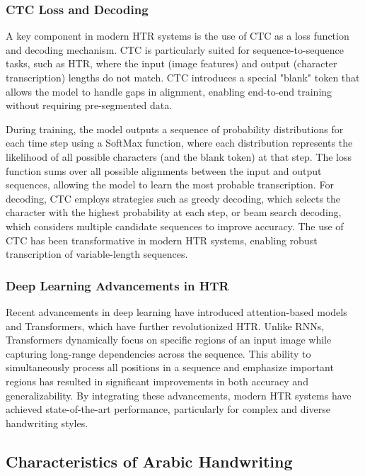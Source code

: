 \documentclass[conference]{IEEEtran}
\begin{document}
\subsubsection{CTC Loss and Decoding}

A key component in modern HTR systems is the use of CTC as a loss function and decoding mechanism. CTC is particularly suited for sequence-to-sequence tasks, such as HTR, where the input (image features) and output (character transcription) lengths do not match. CTC introduces a special "blank" token that allows the model to handle gaps in alignment, enabling end-to-end training without requiring pre-segmented data.

During training, the model outputs a sequence of probability distributions for each time step using a SoftMax function, where each distribution represents the likelihood of all possible characters (and the blank token) at that step. The loss function sums over all possible alignments between the input and output sequences, allowing the model to learn the most probable transcription. For decoding, CTC employs strategies such as greedy decoding, which selects the character with the highest probability at each step, or beam search decoding, which considers multiple candidate sequences to improve accuracy. The use of CTC has been transformative in modern HTR systems, enabling robust transcription of variable-length sequences.

\subsubsection{Deep Learning Advancements in HTR}

Recent advancements in deep learning have introduced attention-based models and Transformers, which have further revolutionized HTR. Unlike RNNs, Transformers dynamically focus on specific regions of an input image while capturing long-range dependencies across the sequence. This ability to simultaneously process all positions in a sequence and emphasize important regions has resulted in significant improvements in both accuracy and generalizability. By integrating these advancements, modern HTR systems have achieved state-of-the-art performance, particularly for complex and diverse handwriting styles.



\subsection{Characteristics of Arabic Handwriting}
\end{document}
